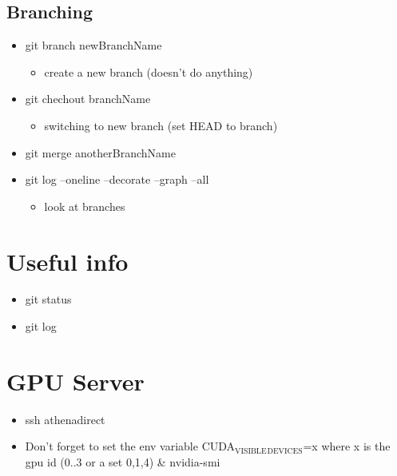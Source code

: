 \documentclass[11pt]{article}
\begin{document}
\subsection{Branching}
\label{sec:orgc7f9a89}
\begin{itemize}
\item git branch newBranchName
\begin{itemize}
\item create a new branch (doesn't do anything)
\end{itemize}
\item git chechout branchName
\begin{itemize}
\item switching to new branch (set HEAD to branch)
\end{itemize}
\item git merge anotherBranchName
\item git log --oneline --decorate --graph --all
\begin{itemize}
\item look at branches
\end{itemize}
\end{itemize}

\section{Useful info}
\label{sec:org5ebf23f}
\begin{itemize}
\item git status
\item git log
\end{itemize}

\section{GPU Server}
\label{sec:org4349bb1}
\begin{itemize}
\item ssh athenadirect
\item Don’t forget to set the env variable CUDA\(_{\text{VISIBLE}}\)\(_{\text{DEVICES}}\)=x where
x is the gpu id (0..3 or a set 0,1,4) \& nvidia-smi
\end{itemize}
\end{document}
